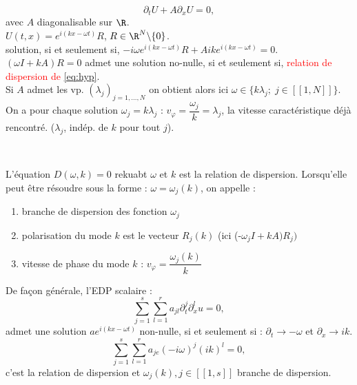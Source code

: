 \documentclass[12pt,a4paper]{article}
\begin{document}
	\begin{equation}\label{eq:hyp}
		\partial_t U + A \partial_x U = 0,
	\end{equation}
	avec $A$ diagonalisable sur $\R$.\\
	$U(t,x) = e^{i(kx-\omega t)}R$, $R \in \R^N \backslash\{0\}$.\\
	solution, si et seulement si, $-i\omega e^{i(kx-\omega t)}R + Aike^{i(kx-\omega t)} = 0$.\\
	$(\omega I + kA) R = 0$ admet une solution no-nulle, si et seulement si,  \textcolor{red}{relation de dispersion de \eqref{eq:hyp}}.\\
	Si $A$ admet les vp. $(\lambda_j)_{j=1,\ldots,N}$ on obtient alors ici $\omega \in \{k \lambda_j;\;j\in[\![1,N]\!]\}$. On a pour chaque solution $\omega_j=k\lambda_j$ : $v_\varphi = \dfrac{\omega_j}{k} = \lambda_j$, la vitesse caractéristique déjà rencontré. ($\lambda_j$, indép. de $k$ pour tout $j$).
	
	\begin{defi}$ $\\
		\begin{minipage}{17cm}
			L'équation $D(\omega,k) = 0$ rekuabt $\omega$ et $k$ est la relation de dispersion. Lorsqu'elle peut être résoudre sous la forme : $\omega = \omega_j(k)$, on appelle :
			\begin{enumerate}[label=$\textbullet$]
				\item branche de dispersion des fonction $\omega_j$
				\item polarisation du mode $k$ est le vecteur $R_j(k)$ (ici (-$\omega_j I+k A)R_j)$
				\item vitesse de phase du mode $k$ : $v_\varphi = \dfrac{\omega_j(k)}{k}$
			\end{enumerate}
		\end{minipage}
	\end{defi}
	De façon générale, l'EDP scalaire :
	\begin{equation}
		\sum_{j=1}^s \sum_{l=1}^r a_{jl}\partial_t^j \partial_x^l u = 0,
	\end{equation}
	admet une solution $ae^{i(kx-\omega t)}$ non-nulle, si et seulement si : $\partial_t \longrightarrow -\omega$ et $\partial_x \longrightarrow ik$.
	\[
	\sum_{j=1}^s\sum_{l=1}^r a_{je} (-i\omega)^j (ik)^l = 0,
	\]
	c'est la relation de dispersion et $\omega_j(k) , j \in [\![1,s]\!]$ branche de dispersion.
	
\end{document}
